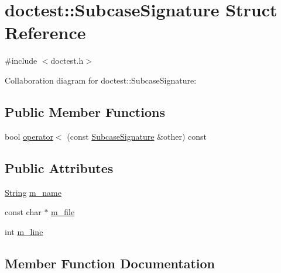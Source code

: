 \hypertarget{structdoctest_1_1_subcase_signature}{}\section{doctest\+:\+:Subcase\+Signature Struct Reference}
\label{structdoctest_1_1_subcase_signature}


{\ttfamily \#include $<$doctest.\+h$>$}



Collaboration diagram for doctest\+:\+:Subcase\+Signature\+:
\subsection*{Public Member Functions}
\begin{DoxyCompactItemize}
\item 
bool \hyperlink{structdoctest_1_1_subcase_signature_a07364f9dddf615f51e15f09b994d4bef}{operator$<$} (const \hyperlink{structdoctest_1_1_subcase_signature}{Subcase\+Signature} \&other) const
\end{DoxyCompactItemize}
\subsection*{Public Attributes}
\begin{DoxyCompactItemize}
\item 
\hyperlink{classdoctest_1_1_string}{String} \hyperlink{structdoctest_1_1_subcase_signature_a61081d1b920e862241e6f81731fb8a58}{m\+\_\+name}
\item 
const char $\ast$ \hyperlink{structdoctest_1_1_subcase_signature_adc680b4597c89fb81ae8fed7fc41414d}{m\+\_\+file}
\item 
int \hyperlink{structdoctest_1_1_subcase_signature_a73fb5432d0f8b82ffbe262b86af5c643}{m\+\_\+line}
\end{DoxyCompactItemize}


\subsection{Member Function Documentation}
\mbox{\label{structdoctest_1_1_subcase_signature_a07364f9dddf615f51e15f09b994d4bef}} 
